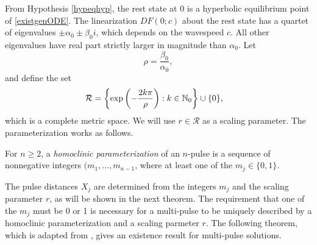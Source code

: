 \documentclass[thesis.tex]{subfiles}
\begin{document}
From Hypothesis \ref{hypeqhyp}, the rest state at 0 is a hyperbolic equilibrium point of \cref{existgenODE}. The linearization $DF(0; c)$ about the rest state has a quartet of eigenvalues $\pm \alpha_0 \pm \beta_0 i$, which depends on the wavespeed $c$. All other eigenvalues have real part strictly larger in magnitude than $\alpha_0$. Let
\begin{equation*}
\rho = \frac{\beta_0}{\alpha_0},
\end{equation*}
and define the set
\begin{align*}
\mathcal{R} &= \left\{ \mathop\mathrm{exp}\nolimits\left(-\frac{2 k \pi}{\rho}\right) : k \in \mathbb{N}_0 \right\} \cup \{ 0 \},
\end{align*}
which is a complete metric space. We will use $r \in \mathcal{R}$ as a scaling parameter. The parameterization works as follows.

\begin{definition}\label{def:homparam}
For $n \geq 2$, a \emph{homoclinic parameterization} of an $n$-pulse is a sequence of nonnegative integers $(m_1, \dots, m_{n-1}$, where at least one of the $m_j \in \{0, 1\}$.
\end{definition}
The pulse distances $X_j$ are determined from the integers $m_j$ and the scaling parameter $r$, as will be shown in the next theorem. The requirement that one of the $m_j$ must be 0 or 1 is necessary for a multi-pulse to be uniquely described by a homoclinic parameterization and a scaling parmeter $r$. The following theorem, which is adapted from \cite[Theorem 3.6]{SandstedeStrut}, gives an existence result for multi-pulse solutions.
\end{document}

